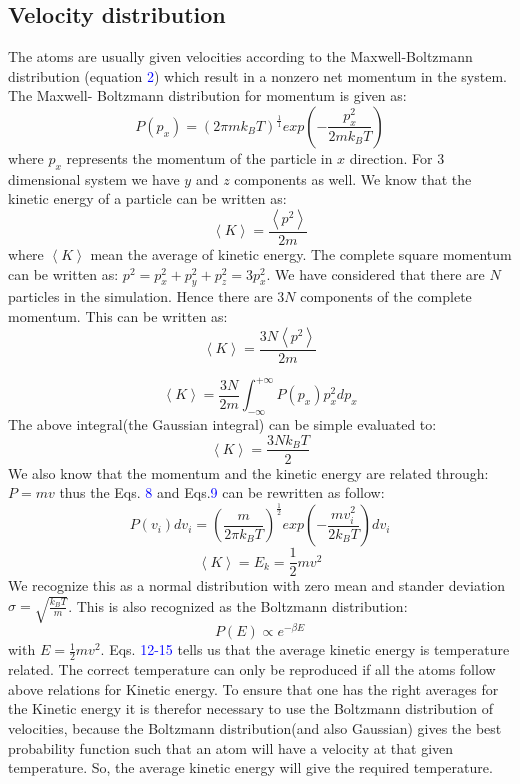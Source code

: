 \documentclass[a4paper]{article}
\begin{document}
\subsection{Velocity distribution}
The atoms are usually given velocities according to the Maxwell-Boltzmann distribution (equation \textcolor{blue}{2}) which result in a nonzero net momentum in the system. The Maxwell- Boltzmann distribution for momentum is given as: 
\begin{equation}
P(p_x) = \left(2\pi m k_B T\right)^{\frac{1}{1}} exp\left(-\frac{p^2_x}{2mk_B T}\right)
\end{equation}
where $p_x$ represents the momentum of the particle in $x$ direction. For 3 dimensional system we have $y$ and $z$ components as well. We know that the kinetic energy of a particle can be written as:
\begin{equation}
\left< K \right > = \frac{\left < p^2\right >}{2m}
\end{equation}
where $\left< K \right >$ mean the average of kinetic energy. The complete square momentum can be written as: $p^2 = p^2_x + p^2_y + p^2_z = 3p^2_x$. We have considered that there are $N$ particles in the simulation. Hence there are $3N$ components of the complete momentum. This can be written as:
\begin{equation}
\left< K \right > = \frac{3N\left < p^2\right >}{2m}
\end{equation}

\begin{equation}
\left< K \right > = \frac{3N}{2m} \int_{-\infty}^{+\infty}P(p_x)p^2_x dp_x
\end{equation}
The above integral(the Gaussian integral) can be simple evaluated to:
\begin{equation}
\left< K \right > = \frac{3N k_B T}{2}
\end{equation}
We also know that the momentum and the kinetic energy are related through: $P  = mv$ thus the Eqs. \textcolor{blue}{8} and Eqs.\textcolor{blue}{9} can be rewritten as follow: 
\begin{equation}
P(v_i)dv_i = \left(\frac{m}{2\pi k_B T}\right)^{\frac{1}{2}}exp\left(-\frac{mv^2_i}{2k_BT}\right) dv_i
\end{equation}
\begin{equation}
\left< K \right > = E_k = \frac{1}{2}mv^2
\end{equation}
We recognize this as a normal distribution with zero mean and stander deviation $\sigma = \sqrt{\frac{k_B T}{m}}$. This is also recognized as the Boltzmann distribution:
\begin{equation}
P(E) \propto e^{-\beta E}
\end{equation}
with $E=\frac{1}{2}mv^2$.  Eqs. \textcolor{blue}{12-15} tells us that the average kinetic energy is temperature related. The correct temperature can only be reproduced if all the atoms follow above relations for Kinetic energy. To ensure that one has the right averages for the Kinetic energy it is therefor necessary to use the Boltzmann distribution of velocities, because the Boltzmann distribution(and also Gaussian) gives the best probability function such that an atom will have a velocity at that given temperature. So, the average kinetic energy will give the required temperature.
\end{document}
